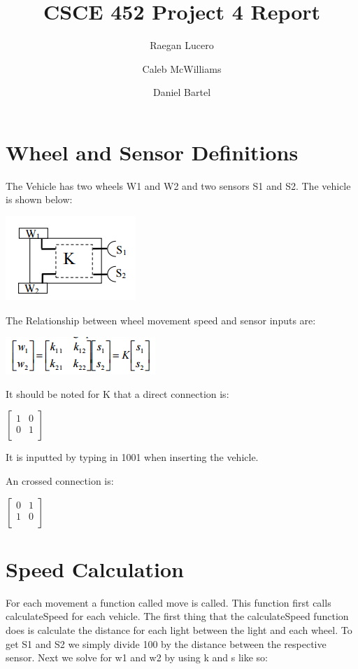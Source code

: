 \documentclass{article}
\title{CSCE 452 Project 4 Report}
\author{Raegan Lucero
\and
 Caleb McWilliams
\and
 Daniel Bartel}
\date{}
\begin{document}
\maketitle

\section*{Wheel and Sensor Definitions}

The Vehicle has two wheels W1 and W2 and two sensors S1 and S2. The vehicle is shown below:
\begin{center}
\includegraphics{vehicle}
\end{center}
The Relationship between wheel movement speed and sensor inputs are:
\begin{center}
\includegraphics{Wheelspeeds}
\end{center}
It should be noted for K that a direct connection is:
\begin{center}
$
\begin{bmatrix}
1 & 0\\

0 & 1 \\

\end{bmatrix}
$
\end{center}
It is inputted by typing in 1001 when inserting the vehicle.

An crossed connection is:
\begin{center}
$
\begin{bmatrix}
0 & 1\\

1 & 0 \\

\end{bmatrix}
$
\end{center}
\section*{Speed Calculation}
For each movement a function called move is called. This function first calls calculateSpeed for each vehicle. The first thing that the calculateSpeed function does is calculate the distance for each light between the light and each wheel. To get S1 and S2 we simply divide 100 by the distance between the respective sensor. Next we solve for w1 and w2 by using k and s like so:
\end{document}
